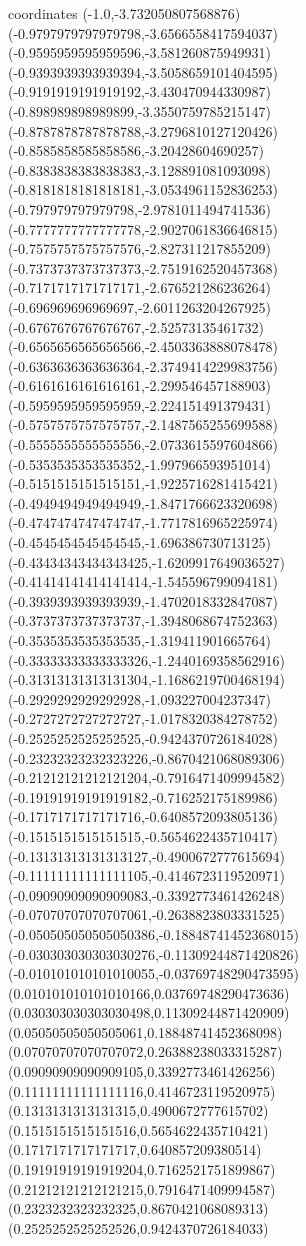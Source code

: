 coordinates {%
(-1.0,-3.732050807568876)
(-0.9797979797979798,-3.6566558417594037)
(-0.9595959595959596,-3.581260875949931)
(-0.9393939393939394,-3.5058659101404595)
(-0.9191919191919192,-3.430470944330987)
(-0.898989898989899,-3.3550759785215147)
(-0.8787878787878788,-3.2796810127120426)
(-0.8585858585858586,-3.20428604690257)
(-0.8383838383838383,-3.128891081093098)
(-0.8181818181818181,-3.0534961152836253)
(-0.797979797979798,-2.9781011494741536)
(-0.7777777777777778,-2.9027061836646815)
(-0.7575757575757576,-2.827311217855209)
(-0.7373737373737373,-2.7519162520457368)
(-0.7171717171717171,-2.676521286236264)
(-0.696969696969697,-2.6011263204267925)
(-0.6767676767676767,-2.52573135461732)
(-0.6565656565656566,-2.4503363888078478)
(-0.6363636363636364,-2.3749414229983756)
(-0.6161616161616161,-2.299546457188903)
(-0.5959595959595959,-2.224151491379431)
(-0.5757575757575757,-2.1487565255699588)
(-0.5555555555555556,-2.0733615597604866)
(-0.5353535353535352,-1.997966593951014)
(-0.5151515151515151,-1.9225716281415421)
(-0.4949494949494949,-1.8471766623320698)
(-0.4747474747474747,-1.7717816965225974)
(-0.4545454545454545,-1.696386730713125)
(-0.43434343434343425,-1.6209917649036527)
(-0.41414141414141414,-1.545596799094181)
(-0.3939393939393939,-1.4702018332847087)
(-0.3737373737373737,-1.3948068674752363)
(-0.3535353535353535,-1.319411901665764)
(-0.33333333333333326,-1.2440169358562916)
(-0.31313131313131304,-1.1686219700468194)
(-0.2929292929292928,-1.093227004237347)
(-0.2727272727272727,-1.0178320384278752)
(-0.2525252525252525,-0.9424370726184028)
(-0.23232323232323226,-0.8670421068089306)
(-0.21212121212121204,-0.7916471409994582)
(-0.19191919191919182,-0.716252175189986)
(-0.1717171717171716,-0.6408572093805136)
(-0.1515151515151515,-0.5654622435710417)
(-0.13131313131313127,-0.4900672777615694)
(-0.11111111111111105,-0.4146723119520971)
(-0.09090909090909083,-0.3392773461426248)
(-0.07070707070707061,-0.2638823803331525)
(-0.050505050505050386,-0.18848741452368015)
(-0.030303030303030276,-0.11309244871420826)
(-0.010101010101010055,-0.03769748290473595)
(0.010101010101010166,0.03769748290473636)
(0.030303030303030498,0.11309244871420909)
(0.05050505050505061,0.18848741452368098)
(0.07070707070707072,0.26388238033315287)
(0.09090909090909105,0.3392773461426256)
(0.11111111111111116,0.4146723119520975)
(0.1313131313131315,0.4900672777615702)
(0.1515151515151516,0.5654622435710421)
(0.1717171717171717,0.640857209380514)
(0.19191919191919204,0.7162521751899867)
(0.21212121212121215,0.7916471409994587)
(0.2323232323232325,0.8670421068089313)
(0.2525252525252526,0.9424370726184033)
}
